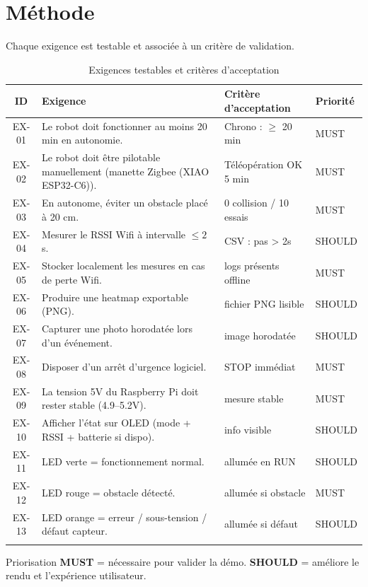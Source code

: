 \documentclass[a4paper,12pt]{report}
\begin{document}
\section{Méthode}
Chaque exigence est testable et associée à un critère de validation.

\begin{longtable}{|c|p{7.6cm}|p{3.6cm}|p{1.8cm}|}
\hline
\rowcolor{UTGreen!25}\textbf{ID} & \textbf{Exigence} & \textbf{Critère d’acceptation} & \textbf{Priorité} \\ \hline
\endhead

EX-01 & Le robot doit fonctionner au moins 20 min en autonomie. & Chrono : \(\geq\) 20 min & MUST \\ \hline
EX-02 & Le robot doit être pilotable manuellement (manette Zigbee (XIAO ESP32-C6)). & Téléopération OK 5 min & MUST \\ \hline
EX-03 & En autonome, éviter un obstacle placé à 20 cm. & 0 collision / 10 essais & MUST \\ \hline
EX-04 & Mesurer le RSSI Wifi à intervalle \(\leq 2\) s. & CSV : pas > 2s & SHOULD \\ \hline
EX-05 & Stocker localement les mesures en cas de perte Wifi. & logs présents offline & MUST \\ \hline
EX-06 & Produire une heatmap exportable (PNG). & fichier PNG lisible & SHOULD \\ \hline
EX-07 & Capturer une photo horodatée lors d’un événement. & image horodatée & SHOULD \\ \hline
EX-08 & Disposer d’un arrêt d’urgence logiciel. & STOP immédiat & MUST \\ \hline
EX-09 & La tension 5V du Raspberry Pi doit rester stable (4.9–5.2V). & mesure stable & MUST \\ \hline
EX-10 & Afficher l’état sur OLED (mode + RSSI + batterie si dispo). & info visible & SHOULD \\ \hline
EX-11 & LED verte = fonctionnement normal. & allumée en RUN & SHOULD \\ \hline
EX-12 & LED rouge = obstacle détecté. & allumée si obstacle & MUST \\ \hline
EX-13 & LED orange = erreur / sous-tension / défaut capteur. & allumée si défaut & SHOULD \\ \hline

\caption{Exigences testables et critères d'acceptation}
\end{longtable}

\begin{justification}{Priorisation}
\textbf{MUST} = nécessaire pour valider la démo.  
\textbf{SHOULD} = améliore le rendu et l’expérience utilisateur.
\end{justification}
\end{document}
